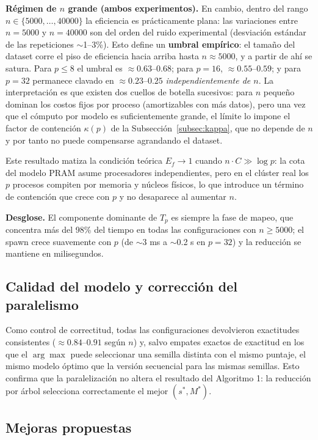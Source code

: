 \documentclass[11pt, a4paper]{article}
\begin{document}
\textbf{Régimen de $n$ grande (ambos experimentos).} En cambio, dentro del rango $n \in \{5000, \dots, 40000\}$ la eficiencia es prácticamente plana: las variaciones entre $n = 5000$ y $n = 40000$ son del orden del ruido experimental (desviación estándar de las repeticiones $\sim$1--3\%). Esto define un \textbf{umbral empírico}: el tamaño del dataset corre el piso de eficiencia hacia arriba hasta $n \approx 5000$, y a partir de ahí se satura. Para $p \le 8$ el umbral es $\approx 0.63$--$0.68$; para $p = 16$, $\approx 0.55$--$0.59$; y para $p = 32$ permanece clavado en $\approx 0.23$--$0.25$ \emph{independientemente de $n$}. La interpretación es que existen dos cuellos de botella sucesivos: para $n$ pequeño dominan los costos fijos por proceso (amortizables con más datos), pero una vez que el cómputo por modelo es suficientemente grande, el límite lo impone el factor de contención $\kappa(p)$ de la Subsección~\ref{subsec:kappa}, que no depende de $n$ y por tanto no puede compensarse agrandando el dataset.

Este resultado matiza la condición teórica $E_f \to 1$ cuando $n \cdot C \gg \log p$: la cota del modelo PRAM asume procesadores independientes, pero en el clúster real los $p$ procesos compiten por memoria y núcleos físicos, lo que introduce un término de contención que crece con $p$ y no desaparece al aumentar $n$.

\textbf{Desglose.} El componente dominante de $T_p$ es siempre la fase de mapeo, que concentra más del 98\% del tiempo en todas las configuraciones con $n \ge 5000$; el spawn crece suavemente con $p$ (de $\sim$3 ms a $\sim$0.2 s en $p=32$) y la reducción se mantiene en milisegundos.

\subsection{Calidad del modelo y corrección del paralelismo}

Como control de correctitud, todas las configuraciones devolvieron exactitudes consistentes ($\approx 0.84$--$0.91$ según $n$) y, salvo empates exactos de exactitud en los que el $\arg\max$ puede seleccionar una semilla distinta con el mismo puntaje, el mismo modelo óptimo que la versión secuencial para las mismas semillas. Esto confirma que la paralelización no altera el resultado del Algoritmo 1: la reducción por árbol selecciona correctamente el mejor $(s^*, M^*)$.

\subsection{Mejoras propuestas}
\end{document}
